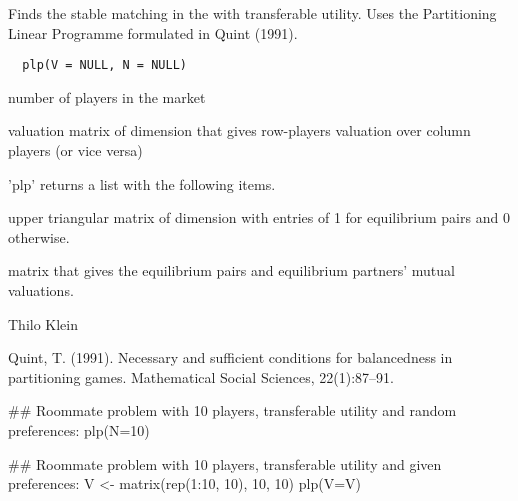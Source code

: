 \documentclass[letterpaper]{book}
\begin{document}
%
\begin{Description}\relax
Finds the stable matching in the
 with transferable utility. Uses the
Partitioning Linear Programme formulated in Quint (1991).
\end{Description}
%
\begin{Usage}
\begin{verbatim}
  plp(V = NULL, N = NULL)
\end{verbatim}
\end{Usage}
%
\begin{Arguments}
\begin{ldescription}
\item[\code{N}] number of players in the market

\item[\code{V}] valuation matrix of dimension  that
gives row-players valuation over column players (or vice
versa)
\end{ldescription}
\end{Arguments}
%
\begin{Value}
'plp' returns a list with the following items.
\begin{ldescription}
\item[\code{Assignment.matrix}] upper triangular matrix of
dimension  with entries of 1 for equilibrium
pairs and 0 otherwise.\item[\code{Equilibrium.groups}] matrix
that gives the  equilibrium pairs and
equilibrium partners' mutual valuations.
\end{ldescription}
\end{Value}
%
\begin{Author}\relax
Thilo Klein 
\end{Author}
%
\begin{References}\relax
Quint, T. (1991). Necessary and sufficient conditions for
balancedness in partitioning games. Mathematical Social
Sciences, 22(1):87--91.
\end{References}
%
\begin{Examples}
\begin{ExampleCode}
## Roommate problem with 10 players, transferable utility and random preferences:
plp(N=10)

## Roommate problem with 10 players, transferable utility and given preferences:
V <- matrix(rep(1:10, 10), 10, 10)
plp(V=V)
\end{ExampleCode}
\end{Examples}
\end{document}
